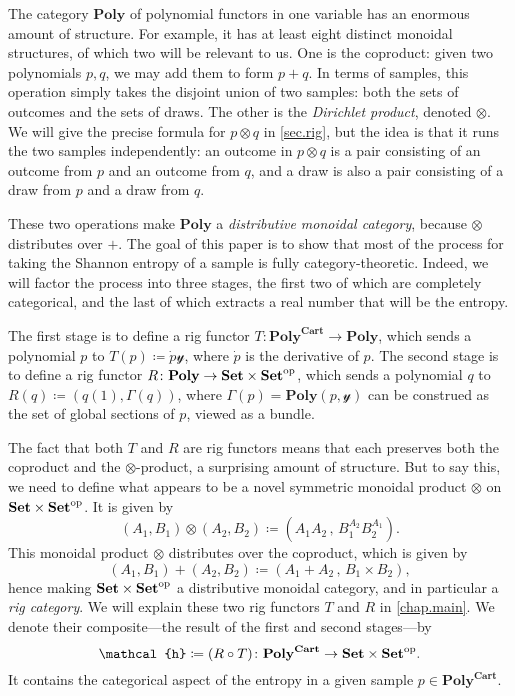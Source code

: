 \documentclass[11pt, one side, article]{memoir}
\theoremstyle{definition}
\theoremstyle{plain}
\newcommand{\Cat}[1]{\mathbf{#1}}%
\newcommand{\op}{^\tn{op}}
\newcommand{\tn}[1]{\textnormal{#1}}
\newcommand{\smset}{\Cat{Set}}
\newcommand{\yon}{\mathcal{y}}
\newcommand{\poly}{\Cat{Poly}}
\newcommand{\polycart}{\poly^{\Cat{Cart}}}
\newcommand{\hh}{\mathcal{h}}
\newcommand{\0}{\textsf{0}}
\newcommand{\1}{\tn{\textsf{1}}}
\newcommand{\R}{R}
\newcommand{\T}{T}
\begin{document}
The category $\poly$ of polynomial functors in one variable has an enormous amount of structure. For example, it has at least eight distinct monoidal structures, of which two will be relevant to us. One is the coproduct: given two polynomials $p,q$, we may add them to form $p+q$. In terms of samples, this operation simply takes the disjoint union of two samples: both the sets of outcomes and the sets of draws. The other is the \emph{Dirichlet product}, denoted $\otimes$. We will give the precise formula for $p\otimes q$ in \cref{sec.rig}, but the idea is that it runs the two samples independently: an outcome in $p\otimes q$ is a pair consisting of an outcome from $p$ and an outcome from $q$, and a draw is also a pair consisting of a draw from $p$ and a draw from $q$.

These two operations make $\poly$ a \emph{distributive monoidal category}, because $\otimes$ distributes over $+$. The goal of this paper is to show that most of the process for taking the Shannon entropy of a sample is fully category-theoretic. Indeed, we will factor the process into three stages, the first two of which are completely categorical, and the last of which extracts a real number that will be the entropy. 

The first stage is to define a rig functor $\T\colon\polycart\to\poly$, which sends a polynomial $p$ to $\T(p)\coloneqq\dot{p}\yon$, where $\dot{p}$ is the derivative of $p$. The second stage is to define a rig functor $\R\colon\poly\to\smset\times\smset\op$, which sends a polynomial $q$ to $\R(q)\coloneqq(q(1),\Gamma(q))$, where $\Gamma(p)=\poly(p,\yon)$ can be construed as the set of global sections of $p$, viewed as a bundle. 

The fact that both $\T$ and $\R$ are rig functors means that each preserves both the coproduct and the $\otimes$-product, a surprising amount of structure. But to say this, we need to define what appears to be a novel symmetric monoidal product $\otimes$ on $\smset\times\smset\op$. It is given by
\[
	(A_1,B_1)\otimes(A_2,B_2)\coloneqq\left(A_1A_2\,,\,B_1^{A_2}B_2^{A_1}\right).
\]
This monoidal product $\otimes$ distributes over the coproduct, which is given by
\[
(A_1,B_1)+(A_2,B_2)\coloneqq\left(A_1+A_2\,,\,B_1\times B_2\right),
\]
hence making $\smset\times\smset\op$ a distributive monoidal category, and in particular a \emph{rig category}. We will explain these two rig functors $\T$ and $\R$ in \cref{chap.main}. We denote their composite---the result of the first and second stages---by
\[\hh\coloneqq(\R\circ\T)\colon\polycart\to\smset\times\smset\op.\]
It contains the categorical aspect of the entropy in a given sample $p\in\polycart$.
\end{document}
